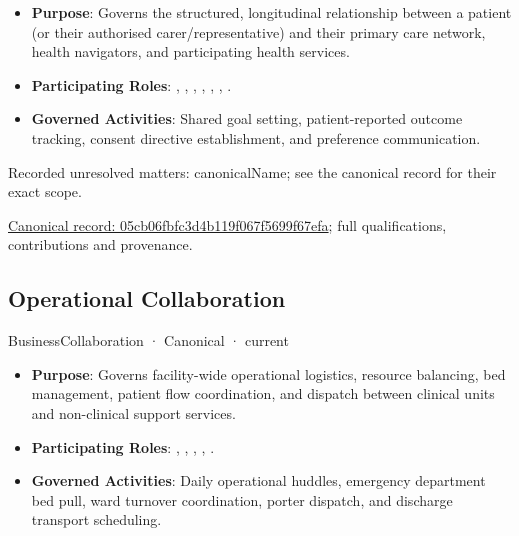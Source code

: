 \begin{itemize}


\item \textbf{Purpose}: Governs the structured, longitudinal relationship between a patient (or their authorised carer/representative) and their primary care network, health navigators, and participating health services.

\item \textbf{Participating Roles}: \texttt{}, \texttt{}, \texttt{}, \texttt{}, \texttt{}, \texttt{}, \texttt{}.

\item \textbf{Governed Activities}: Shared goal setting, patient-reported outcome tracking, consent directive establishment, and preference communication.

\end{itemize}

{\small Recorded unresolved matters: canonicalName; see the canonical record for their exact scope.}\par
{\footnotesize \href{../../../../continuum/business/business-collaboration/05cb06fbfc3d4b119f067f5699f67efa.md}{Canonical record: 05cb06fbfc3d4b119f067f5699f67efa}; full qualifications, contributions and provenance.}\par
\subsection{Operational Collaboration}

\label{element:20f31ce141f947af8700fe7f41d695f6}
{\small BusinessCollaboration · Canonical · current}\par

\begin{itemize}


\item \textbf{Purpose}: Governs facility-wide operational logistics, resource balancing, bed management, patient flow coordination, and dispatch between clinical units and non-clinical support services.

\item \textbf{Participating Roles}: \texttt{}, \texttt{}, \texttt{}, \texttt{}, \texttt{}.

\item \textbf{Governed Activities}: Daily operational huddles, emergency department bed pull, ward turnover coordination, porter dispatch, and discharge transport scheduling.

\end{itemize}


